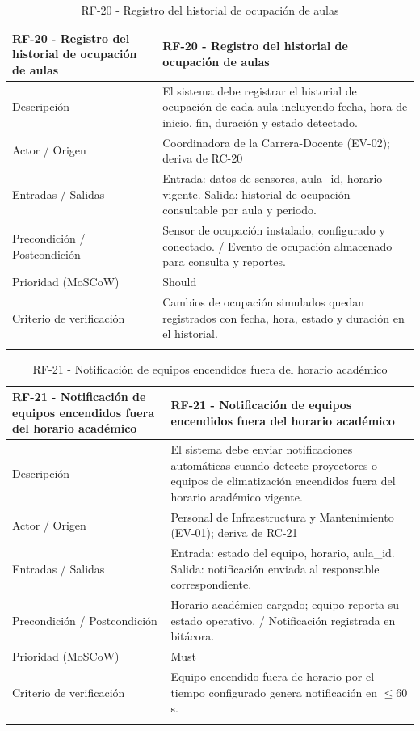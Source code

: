 \begingroup
\small
\begin{longtable}{|p{7.8cm}|p{7.8cm}|}
\hline
RF-20 - Registro del historial de ocupación de aulas & RF-20 - Registro del historial de ocupación de aulas \\ \hline
Descripción & El sistema debe registrar el historial de ocupación de cada aula incluyendo fecha, hora de inicio, fin, duración y estado detectado. \\ \hline
Actor / Origen & Coordinadora de la Carrera-Docente (EV-02); deriva de RC-20 \\ \hline
Entradas / Salidas & Entrada: datos de sensores, aula\_id, horario vigente. Salida: historial de ocupación consultable por aula y periodo. \\ \hline
Precondición / Postcondición & Sensor de ocupación instalado, configurado y conectado. / Evento de ocupación almacenado para consulta y reportes. \\ \hline
Prioridad (MoSCoW) & Should \\ \hline
Criterio de verificación & Cambios de ocupación simulados quedan registrados con fecha, hora, estado y duración en el historial. \\ \hline
\caption{RF-20 - Registro del historial de ocupación de aulas}
\end{longtable}
\endgroup

\begingroup
\small
\begin{longtable}{|p{7.8cm}|p{7.8cm}|}
\hline
RF-21 - Notificación de equipos encendidos fuera del horario académico & RF-21 - Notificación de equipos encendidos fuera del horario académico \\ \hline
Descripción & El sistema debe enviar notificaciones automáticas cuando detecte proyectores o equipos de climatización encendidos fuera del horario académico vigente. \\ \hline
Actor / Origen & Personal de Infraestructura y Mantenimiento (EV-01); deriva de RC-21 \\ \hline
Entradas / Salidas & Entrada: estado del equipo, horario, aula\_id. Salida: notificación enviada al responsable correspondiente. \\ \hline
Precondición / Postcondición & Horario académico cargado; equipo reporta su estado operativo. / Notificación registrada en bitácora. \\ \hline
Prioridad (MoSCoW) & Must \\ \hline
Criterio de verificación & Equipo encendido fuera de horario por el tiempo configurado genera notificación en $\leq$60 s. \\ \hline
\caption{RF-21 - Notificación de equipos encendidos fuera del horario académico}
\end{longtable}
\endgroup

